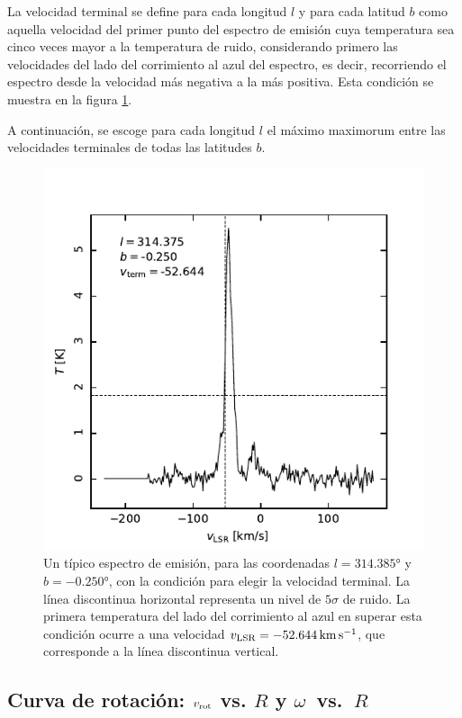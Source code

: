 La velocidad terminal se define para cada longitud $l$ y para cada latitud $b$ como aquella velocidad del primer punto del espectro de emisión cuya temperatura sea cinco veces mayor a la temperatura de ruido, considerando primero las velocidades del lado del corrimiento al azul del espectro, es decir, recorriendo el espectro desde la velocidad más negativa a la más positiva. Esta condición se muestra en la figura \ref{fig:vterminal}.

A continuación, se escoge para cada longitud $l$ el máximo maximorum entre las velocidades terminales de todas las latitudes $b$.

\begin{figure}[p]
	\includegraphics{rsc/vterminal.pdf}
	\caption{Un típico espectro de emisión, para las coordenadas $l=\ang{314.385}$ y $b=\ang{-0.250}$, con la condición para elegir la velocidad terminal. La línea discontinua horizontal representa un nivel de $5\sigma$ de ruido. La primera temperatura del lado del corrimiento al azul en superar esta condición ocurre a una velocidad $v_\textnormal{LSR}=\SI{-52.644}{\kilo\metre\per\second}$, que corresponde a la línea discontinua vertical.}
	\label{fig:vterminal}
\end{figure}

\subsection{Curva de rotación: $v_{\textnormal{rot}}$ vs. $R$ y \mbox{$\omega$ vs. $R$}}

